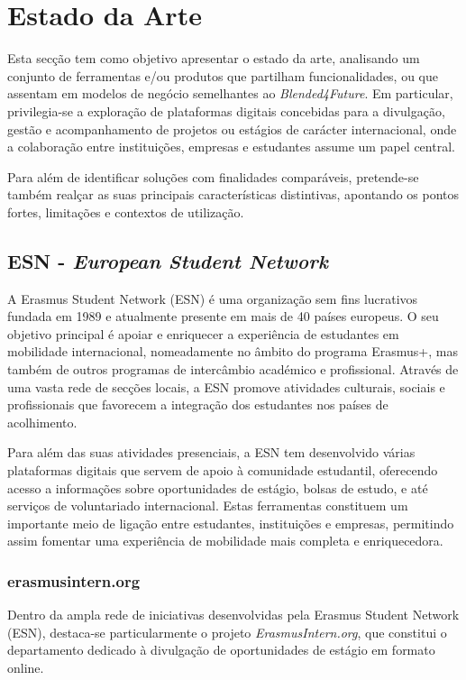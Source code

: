 \chapter{Estado da Arte}
\label{chap:estadodaarte}

Esta secção tem como objetivo apresentar o estado da arte, analisando um conjunto de ferramentas e/ou produtos que partilham funcionalidades, ou que assentam em modelos de negócio semelhantes ao \textit{Blended4Future}. Em particular, privilegia-se a exploração de plataformas digitais concebidas para a divulgação, gestão e acompanhamento de projetos ou estágios de carácter internacional, onde a colaboração entre instituições, empresas e estudantes assume um papel central.

Para além de identificar soluções com finalidades comparáveis, pretende-se também realçar as suas principais características distintivas, apontando os pontos fortes, limitações e contextos de utilização.

\section{ESN - \textit{European Student Network}}

A Erasmus Student Network (ESN) é uma organização sem fins lucrativos fundada em 1989 e atualmente presente em mais de 40 países europeus. O seu objetivo principal é apoiar e enriquecer a experiência de estudantes em mobilidade internacional, nomeadamente no âmbito do programa Erasmus+, mas também de outros programas de intercâmbio académico e profissional. Através de uma vasta rede de secções locais, a ESN promove atividades culturais, sociais e profissionais que favorecem a integração dos estudantes nos países de acolhimento.

Para além das suas atividades presenciais, a ESN tem desenvolvido várias plataformas digitais que servem de apoio à comunidade estudantil, oferecendo acesso a informações sobre oportunidades de estágio, bolsas de estudo, e até serviços de voluntariado internacional. Estas ferramentas constituem um importante meio de ligação entre estudantes, instituições e empresas, permitindo assim fomentar uma experiência de mobilidade mais completa e enriquecedora.

\subsection{erasmusintern.org}

Dentro da ampla rede de iniciativas desenvolvidas pela Erasmus Student Network (ESN), destaca-se particularmente o projeto \textit{ErasmusIntern.org}, que constitui o departamento dedicado à divulgação de oportunidades de estágio em formato online.

